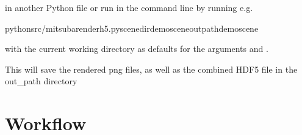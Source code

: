 \documentclass[letterpaper,10pt,english]{sphinxmanual}
\begin{document}
\sphinxAtStartPar
in another Python file or run  in the command line by running e.g.

\begin{sphinxVerbatim}[commandchars=\\\{\}]
pythonsrc/mitsuba\PYGZus{}render\PYGZus{}h5.py\PYGZhy{}\PYGZhy{}scene\PYGZus{}dirdemo\PYGZus{}scene\PYGZhy{}\PYGZhy{}out\PYGZus{}pathdemo\PYGZus{}scene
\end{sphinxVerbatim}

\sphinxAtStartPar
with the current working directory as defaults for the arguments  and .

\sphinxAtStartPar
This will save the rendered png files, as well as the combined HDF5 file in the out\_path directory


\section{Workflow}
\label{\detokenize{index:workflow}}
\sphinxAtStartPar
{}


\renewcommand{\indexname}{Python Module Index}
\begin{sphinxtheindex}
\let\bigletter\sphinxstyleindexlettergroup
\bigletter{b}
\item\relax{}
\indexspace
\bigletter{m}
\item\relax{}
\indexspace
\bigletter{t}
\item\relax{}
\end{sphinxtheindex}

\renewcommand{\indexname}{Index}
\printindex
\end{document}
